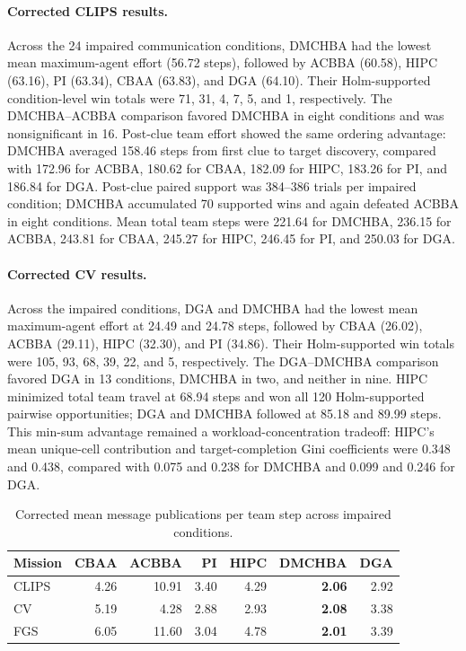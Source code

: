 \paragraph{Corrected CLIPS results.}
Across the 24 impaired communication conditions, DMCHBA had the lowest mean maximum-agent effort (56.72 steps), followed by ACBBA (60.58), HIPC (63.16), PI (63.34), CBAA (63.83), and DGA (64.10).  Their Holm-supported condition-level win totals were 71, 31, 4, 7, 5, and 1, respectively.  The DMCHBA--ACBBA comparison favored DMCHBA in eight conditions and was nonsignificant in 16.  Post-clue team effort showed the same ordering advantage: DMCHBA averaged 158.46 steps from first clue to target discovery, compared with 172.96 for ACBBA, 180.62 for CBAA, 182.09 for HIPC, 183.26 for PI, and 186.84 for DGA.  Post-clue paired support was 384--386 trials per impaired condition; DMCHBA accumulated 70 supported wins and again defeated ACBBA in eight conditions.  Mean total team steps were 221.64 for DMCHBA, 236.15 for ACBBA, 243.81 for CBAA, 245.27 for HIPC, 246.45 for PI, and 250.03 for DGA.

\paragraph{Corrected CV results.}
Across the impaired conditions, DGA and DMCHBA had the lowest mean maximum-agent effort at 24.49 and 24.78 steps, followed by CBAA (26.02), ACBBA (29.11), HIPC (32.30), and PI (34.86).  Their Holm-supported win totals were 105, 93, 68, 39, 22, and 5, respectively.  The DGA--DMCHBA comparison favored DGA in 13 conditions, DMCHBA in two, and neither in nine.  HIPC minimized total team travel at 68.94 steps and won all 120 Holm-supported pairwise opportunities; DGA and DMCHBA followed at 85.18 and 89.99 steps.  This min-sum advantage remained a workload-concentration tradeoff: HIPC's mean unique-cell contribution and target-completion Gini coefficients were 0.348 and 0.438, compared with 0.075 and 0.238 for DMCHBA and 0.099 and 0.246 for DGA.

\begin{table}[t]
\centering
\caption{Corrected mean message publications per team step across impaired conditions.}
\label{tab:corrected_communication_overhead_summary}
\scriptsize
\setlength{\tabcolsep}{3.0pt}
\begin{tabular}{lrrrrrr}
\toprule
Mission & CBAA & ACBBA & PI & HIPC & DMCHBA & DGA \\
\midrule
CLIPS & 4.26 & 10.91 & 3.40 & 4.29 & \textbf{2.06} & 2.92 \\
CV    & 5.19 & 4.28  & 2.88 & 2.93 & \textbf{2.08} & 3.38 \\
FGS   & 6.05 & 11.60 & 3.04 & 4.78 & \textbf{2.01} & 3.39 \\
\bottomrule
\end{tabular}
\end{table}

